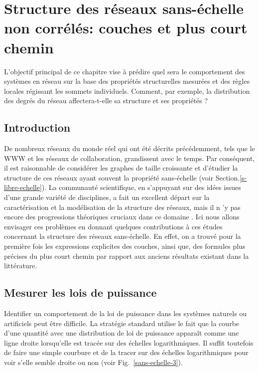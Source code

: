 \newcommand{\nl}{$n_{\ell}$ }
\newcommand{\km}{\textless k \textgreater}
\chapter{Structure des réseaux sans-échelle non corrélés: couches et plus court chemin}
\label{sec3}
L'objectif principal de ce chapitre vise à prédire quel sera le comportement des systèmes en réseau sur la base des propriétés structurelles mesurées et des règles locales régissant les sommets individuels. Comment, par exemple, la distribution des degrés du réseau affectera-t-elle sa  structure et ses propriétés ?

\section{Introduction}

De nombreux réseaux du monde réel qui ont été décrits précédemment, tels que le WWW et les réseaux de collaboration, grandissent avec le temps. Par conséquent, il est raisonnable de considérer les graphes de taille croissante et d'étudier la structure de ces réseaux ayant souvent la propriété sans-échelle (voir Section.\ref{s-libre-echelle}). 
La communauté scientifique, en s'appuyant sur des idées issues d'une grande variété de disciplines, a fait un excellent départ sur la caractérisation et la modélisation de la structure des réseaux, mais il n 'y pas encore des progressions théoriques cruciaux dans ce domaine \cite{Ne2003}. Ici nous allons envisager ces problèmes en donnant quelques contributions à ces études concernant la structure des réseaux sans-échelle. En effet, on a trouvé pour la première fois les expressions explicites des couches, ainsi que, des formules plus précises du plus court chemin par rapport aux anciens résultats existant dans la littérature. 
\section{Mesurer les lois de puissance}
Identifier un comportement de la loi de puissance dans les systèmes naturels ou artificiels peut être difficile.  La stratégie standard utilise le fait que la courbe d'une quantité avec une distribution de loi de puissance apparaît comme une ligne droite lorsqu'elle est tracée sur des échelles logarithmiques. Il suffit toutefois de faire une simple courbure et de la tracer sur des échelles logarithmiques pour voir s'elle semble droite ou non (voir Fig.~\ref{sans-echelle-3}).\\

